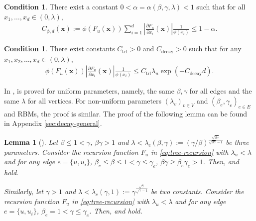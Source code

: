 \documentclass[11pt]{amsart}
\newcommand{\defeq}{:=}
\newtheorem{lemma}[theorem]{Lemma}
\theoremstyle{definition}
\newtheorem{condition}[theorem]{Condition}
\theoremstyle{remark}
\begin{document}
\begin{condition}\label{condition:potential-function-bound}
There exist a constant $0< \alpha = \alpha(\beta,\gamma,\lambda) < 1$ such that for all $x_1,\ldots,x_d \in (0, \lambda)$,
    \begin{align*}
    C_{\phi,d}(\boldsymbol{x}) \defeq \phi(F_u(\boldsymbol{x})) \sum_{i=1}^d \left\vert  \frac{\partial F_u}{\partial x_i}(\boldsymbol{x})  \right\vert \frac{1}{\phi(x_i)}  \leq 1 - \alpha.
    \end{align*}
\end{condition}


\begin{condition}\label{condition:trivial-bound-for-C}
There exist constants $C_{\text{trl}} > 0$ and $C_{\text{decay}} > 0$ such that for any $x_1,x_2,\ldots,x_d \in (0, \lambda)$,
\begin{align*}
    \phi(F_u(\boldsymbol{x})) \left\vert  \frac{\partial F_u}{\partial x_i}(\boldsymbol{x})  \right\vert \frac{1}{\phi(x_i)}
    \leq C_{\text{trl}} \lambda_u \exp(-C_{\text{decay}} d).
\end{align*}
\end{condition}


In \cite{GuoL18},  is proved for uniform parameters, namely, the same $\beta,\gamma$ for all edges and the same $\lambda$ for all vertices. For non-uniform parameters $(\lambda_v)_{v \in V}$ and $(\beta_e,\gamma_e)_{e \in E}$ and RBMs, the proof is similar. The proof of the following lemma can be found in Appendix \ref{sec:decay-general}. 
\begin{lemma}[]\label{lemma:potential-function-bound-GL}
    Let $\beta \leq 1 < \gamma$, $\beta \gamma > 1$ and $\lambda < \lambda_c(\beta,\gamma) \defeq (\gamma/\beta)^{\frac{\sqrt{\beta \gamma}}{\sqrt{\beta \gamma}-1}}$ be three parameters.
    Consider the recursion function $F_u$ in \eqref{eq:tree-recursion} with $\lambda_u < \lambda$ and for any edge $e = \{u,u_i\}$, $\beta_e \leq \beta \leq 1 < \gamma \leq \gamma_e$, $\beta\gamma \geq \beta_e \gamma_e > 1$.
    Then,  and  hold.

    Similarly, let $\gamma > 1$ and $\lambda < \lambda_c(\gamma,1) \defeq \gamma^{\frac{\sqrt{\gamma}}{\sqrt{\gamma}-1}} $ be two constants. Consider the recursion function $F_u$ in \eqref{eq:tree-recursion} with $\lambda_u < \lambda$ and for any edge $e = \{u,u_i\}$, $\beta_e = 1 < \gamma \leq \gamma_e$. Then,  and  hold.
\end{lemma}
\end{document}

